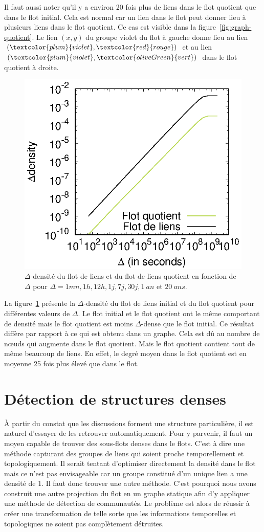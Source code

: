 Il faut aussi noter qu'il y a environ 20 fois plus de liens dans le flot quotient que dans le flot initial.
Cela est normal car un lien dans le flot peut donner lieu à plusieurs liens dans le flot quotient.
Ce cas est visible dans la figure~\ref{fig:graph-quotient}. 
Le lien $(x,y)$ du groupe violet du flot à gauche donne lieu au lien $(\textcolor{plum}{violet}, \textcolor{red}{rouge})$ et au lien $(\textcolor{plum}{violet}, \textcolor{oliveGreen}{vert})$ dans le flot quotient à droite. 

\begin{figure}
\centering
	\includegraphics[width=0.45\linewidth]{img/mailing/quotient-density}
	\caption{$\Delta$-densité du flot de liens et du flot de liens quotient en fonction de $\Delta$ pour $\Delta=1mn, 1h, 12h, 1j, 7j, 30j, 1\ an$ et $20\ ans$.}
	\label{fig:quotient-stream-density}
\end{figure}

La figure~\ref{fig:quotient-stream-density} présente la $\Delta$-densité du flot de liens initial et du flot quotient pour différentes valeurs de $\Delta$.
Le flot initial et le flot quotient ont le même comportant de densité mais le flot quotient est moins $\Delta$-dense que le flot initial.
Ce résultat diffère par rapport à ce qui est obtenu dans un graphe.
Cela est dû au nombre de n\oe uds qui augmente dans le flot quotient.
Mais le flot quotient contient tout de même beaucoup de liens. 
En effet, le degré moyen dans le flot quotient est en moyenne 25 fois plus élevé que dans le flot.


\section{Détection de structures denses}

\`A partir du constat que les discussions forment une structure particulière, il est naturel d'essayer de les retrouver automatiquement. 
Pour y parvenir, il faut un moyen capable de trouver des sous-flots denses dans le flots.
C'est à dire une méthode capturant des groupes de liens qui soient proche temporellement et topologiquement.
Il serait tentant d'optimiser directement la densité dans le flot mais ce n'est pas envisageable car un groupe constitué d'un unique lien a une densité de $1$.
Il faut donc trouver une autre méthode.
C'est pourquoi nous avons construit une autre projection du flot en un graphe statique afin d'y appliquer une méthode de détection de communautés.
Le problème est alors de réussir à créer une transformation de telle sorte que les informations temporelles et topologiques ne soient pas complètement détruites.

